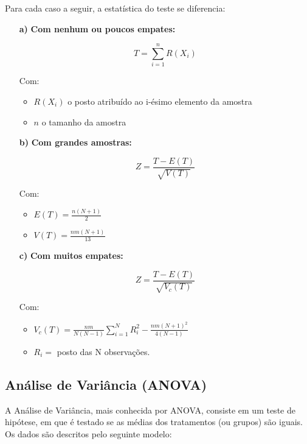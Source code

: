 \documentclass[
]{estat/estat}
\begin{document}

Para cada caso a seguir, a estatística do teste se diferencia:
\begin{itemize}
\item [\bf a)] \textbf{Com nenhum ou poucos empates:}

$$T = \sum_{i=1}^{n}R(X_{i})$$

Com:
\begin{itemize}
\item $R(X_{i})$ o posto atribuído ao i-ésimo elemento da amostra

\item $n$ o tamanho da amostra

\end{itemize}

\item [\bf b)] \textbf{Com grandes amostras:}

$$Z = \frac{T - E(T)}{\sqrt{V(T)}}$$

Com:
\begin{itemize}
\item $E(T) = \displaystyle\frac{n(N+1)}{2}$ 

\item $V(T) = \displaystyle\frac{nm(N+1)}{13}$

\end{itemize}

\item [\bf c)] \textbf{Com muitos empates:}

$$Z = \frac{T - E(T)}{\sqrt{V_{c}(T)}}$$

Com:
\begin{itemize}
\item $V_{c}(T) = \displaystyle \frac{nm}{N(N-1)}\sum_{i=1}^{N}R^{2}_{i}-\frac{nm(N+1)^{2}}{4(N-1)}$ 

\item $R_{i} = $ posto das N observações.

\end{itemize}

\end{itemize}

\subsection{Análise de Variância
(ANOVA)}\label{anuxe1lise-de-variuxe2ncia-anova}

A Análise de Variância, mais conhecida por ANOVA, consiste em um teste
de hipótese, em que é testado se as médias dos tratamentos (ou grupos)
são iguais. Os dados são descritos pelo seguinte modelo:
\end{document}
